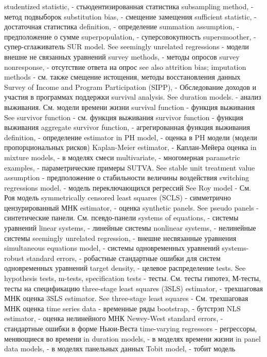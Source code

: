studentized statistic, - стьюдентизированная статистика
subsampling method, - метод подвыборок
substitution bias, - смещение замещения
sufficient statistic, - достаточная статистика
definition, - определение
summation assumption, - предположение о сумме
superpopulation, - суперсовокупность
supersmoother, - супер-сглаживатель
SUR model. See seemingly unrelated regressions - модели внешне не связанных уравнений
survey methods, - методы опросов
survey nonresponse, - отсутствие ответа на опрос
see also attrition bias; imputation methods - см. также смещение истощения, методы восстановления данных
Survey of Income and Program Participation (SIPP), - Обследование доходов и участия в программах поддержки
survival analysis. See duration models. - анализ выживания. См. модели времени жизни
survival function - функция выживания
See survivor function - см. функция выживания
survivor function - функция выживания
aggregate survivor function, - агрегированная функция выживания
definition, - определение
estimator in PH model, - оценка в PH модели (модели пропорциональных рисков)
Kaplan-Meier estimator, - Каплан-Мейера оценка
in mixture models, - в моделях смеси
multivariate, - многомерная
parametric examples, - параметрические примеры
SUTVA. See stable unit treatment value assumption - предположение о стабильности величины воздействия
switching regressions model. - модель переключающихся регрессий
See Roy model - См. Роя модель
symmetrically censored least squares (SCLS) - симметрично цензурированный МНК
estimator, - оценка
synthetic panels. See pseudo panels - синтетические панели. См. псевдо-панели
systems of equations, - системы уравнений
linear systems, - линейные системы
nonlinear systems, - нелинейные системы
seemingly unrelated regression, - внешне несвязанные уравнения
simultaneous equations model, - системы одновременных уравнений
systems-robust standard errors, - робастные стандартные ошибки для систем одновременных уравнений
target density, - целевое распределение
tests. See hypothesis tests, m-tests, specification tests - тесты. См. тесты гипотез, М-тесты, тесты на спецификацию
three-stage least squares (3SLS) estimator, - трехшаговая МНК оценка
3SLS estimator. See three-stage least squares - См. трехшаговая МНК оценка
time series data - временные ряды
bootstrap, - бутстрэп
NLS estimator, - оценка нелинейного МНК
Newey-West standard errors, - стандартные ошибки в форме Ньюи-Веста
time-varying regressors - регрессоры, меняющиеся во времени
in duration models, - в моделях времени жизни
in panel data models, - в моделях панельных данных
Tobit model, - тобит модель
